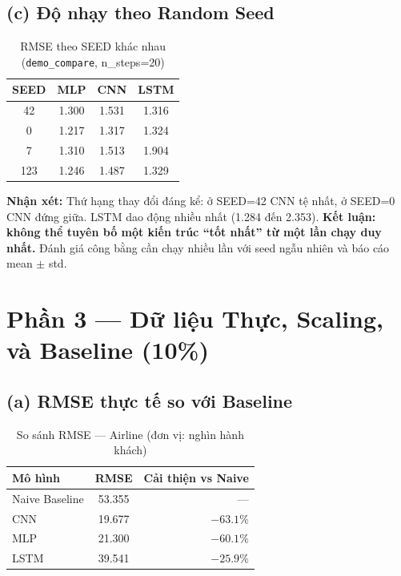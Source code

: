 \documentclass[12pt,a4paper]{article}
\begin{document}
\subsection{(c) Độ nhạy theo Random Seed}

\begin{table}[H]
\centering
\caption{RMSE theo SEED khác nhau (\texttt{demo\_compare}, n\_steps=20)}
\begin{tabular}{cccc}
\toprule
\textbf{SEED} & \textbf{MLP} & \textbf{CNN} & \textbf{LSTM} \\
\midrule
42  & 1.300 & 1.531 & 1.316 \\
0   & 1.217 & 1.317 & 1.324 \\
7   & 1.310 & 1.513 & 1.904 \\
123 & 1.246 & 1.487 & 1.329 \\
\bottomrule
\end{tabular}
\end{table}

\textbf{Nhận xét:} Thứ hạng thay đổi đáng kể: ở SEED=42 CNN tệ nhất, ở SEED=0 CNN đứng giữa. LSTM dao động nhiều nhất (1.284 đến 2.353). \textbf{Kết luận: không thể tuyên bố một kiến trúc ``tốt nhất'' từ một lần chạy duy nhất.} Đánh giá công bằng cần chạy nhiều lần với seed ngẫu nhiên và báo cáo mean $\pm$ std.

\section{Phần 3 --- Dữ liệu Thực, Scaling, và Baseline (10\%)}

\subsection{(a) RMSE thực tế so với Baseline}

\begin{table}[H]
\centering
\caption{So sánh RMSE --- Airline (đơn vị: nghìn hành khách)}
\begin{tabular}{lcr}
\toprule
\textbf{Mô hình} & \textbf{RMSE} & \textbf{Cải thiện vs Naive} \\
\midrule
Naive Baseline & 53.355 & ---       \\
CNN            & 19.677 & $-63.1\%$ \\
MLP            & 21.300 & $-60.1\%$ \\
LSTM           & 39.541 & $-25.9\%$ \\
\bottomrule
\end{tabular}
\end{table}
\end{document}
